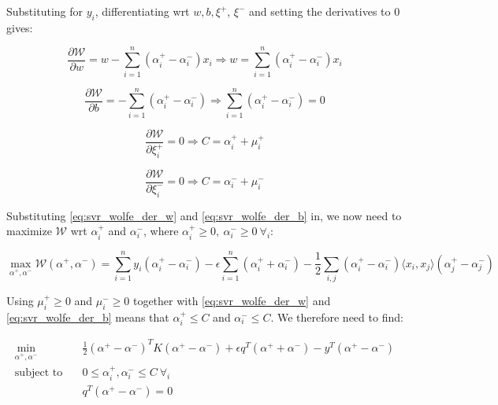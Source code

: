 Substituting for $y_i$, differentiating wrt $w, b, \xi^+$, $\xi^-$ and setting the derivatives to $0$ gives:

\begin{equation} \label{eq:svr_wolfe_der_w}
	\frac{\partial \mathcal{W}}{\partial w}=w-\sum_{i=1}^n (\alpha_i^+ - \alpha_i^-) x_i \Rightarrow w=\sum_{i=1}^n (\alpha_i^+ - \alpha_i^-) x_i
\end{equation}

\begin{equation} \label{eq:svr_wolfe_der_b}
	\frac{\partial \mathcal{W}}{\partial b}=-\sum_{i=1}^n (\alpha_i^+ - \alpha_i^-)\Rightarrow \sum_{i=1}^n (\alpha_i^+ - \alpha_i^-)=0
\end{equation}

\begin{equation}\label{eq:svr_wolfe_der_xip}
	\frac{\partial \mathcal{W}}{\partial\xi_i^+}=0\Rightarrow C=\alpha_i^+ + \mu_i^+
\end{equation}

\begin{equation} \label{eq:svr_wolfe_der_xim}
	\frac{\partial \mathcal{W}}{\partial\xi_i^-}=0\Rightarrow C=\alpha_i^- + \mu_i^-
\end{equation}

Substituting \ref{eq:svr_wolfe_der_w} and \ref{eq:svr_wolfe_der_b} in, we now need to maximize $\mathcal{W}$ wrt $\alpha_i^+$ and $\alpha_i^-$, where $\alpha_i^+ \geq 0,\ \alpha_i^- \geq 0 \ \forall_i$:

\begin{equation} \label{eq:svr_max_wolfe_dual}
    \max_{\alpha^+,\alpha^-} \mathcal{W}(\alpha^+,\alpha^-) = \sum_{i=1}^n y_i(\alpha_i^+ - \alpha_i^-)-\epsilon\sum_{i=1}^n (\alpha_i^+ + \alpha_i^-)-\frac{1}{2}\sum_{i,j}(\alpha_i^+ - \alpha_i^-)\langle x_i, x_j \rangle(\alpha_j ^+ - \alpha_j ^-)
\end{equation}

Using $\mu_i^+ \geq 0$ and $\mu_i^- \geq 0$ together with \ref{eq:svr_wolfe_der_w} and \ref{eq:svr_wolfe_der_b} means that $\alpha_i^+ \leq C$ and $\alpha_i^- \leq C$. We therefore need to find:

\begin{equation} \label{eq:svr_min_wolfe_dual}
    \begin{aligned}
        \min_{\alpha^+,\alpha^-} \quad & \frac{1}{2}(\alpha^+ - \alpha^-)^TK(\alpha^+ - \alpha^-)+\epsilon q^T(\alpha^+ + \alpha^-)-y^T(\alpha^+ - \alpha^-) \\
            \text{subject to} \quad & 0\leq\alpha_i^+,\alpha_i^- \leq C \ \forall_i \\ & q^T(\alpha^+ - \alpha^-)=0
    \end{aligned}
\end{equation}


